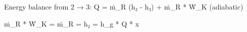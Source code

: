 Energy balance from 2 → 3:  
Q = ṁ_R (h₂ - h₃) + ṁ_R * Ẇ_K (adiabatic)  

ṁ_R * Ẇ_K = ṁ_R = h₂ = h_g * Q * x